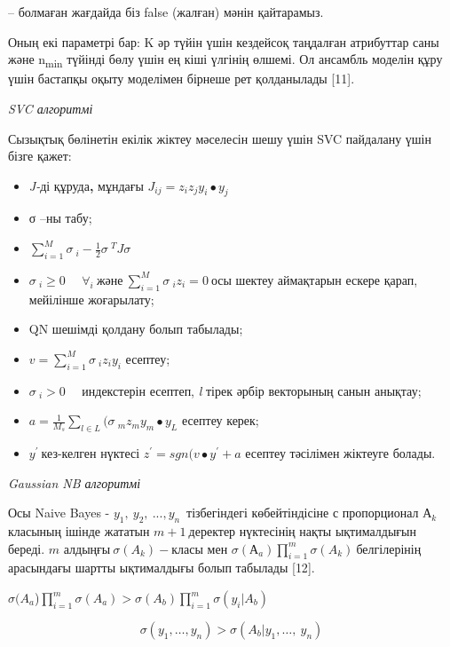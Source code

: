 \documentclass[
]{article}
\begin{document}
-- болмаған жағдайда біз false (жалған) мәнін қайтарамыз.

Оның екі параметрі бар: K әр түйін үшін кездейсоқ таңдалған атрибуттар
саны және n\textsubscript{min} түйінді бөлу үшін ең кіші үлгінің өлшемі.
Ол ансамбль моделін құру үшін бастапқы оқыту моделімен бірнеше рет
қолданылады {[}11{]}.

\emph{SVC алгоритмі}

Сызықтық бөлінетін екілік жіктеу мәселесін шешу үшін SVC пайдалану үшін
бізге қажет:

\begin{itemize}
\item
  \emph{J-}ді құруда\textbf{,} мұндағы
  \(J_{ij} = z_{i}z_{j}y_{i} \bullet y_{j}\)
\item
  σ --ны табу;
\item
  \(\sum_{i = 1}^{M}{}{\sigma\ }_{i} - \frac{1}{2}{\sigma\ }^{T}J\sigma\ \)
\item
  \({\sigma\ }_{i} \geq 0\ \ \ \ \ \ \forall_{i}\ және\ \sum_{i = 1}^{M}{}{\sigma\ }_{i}z_{i} = 0\ \)осы
  шектеу аймақтарын ескере қарап, мейілінше жоғарылату;
\item
  QN шешімді қолдану болып табылады;
\item
  \(v = \sum_{i = 1}^{M}{}{\sigma\ }_{i}z_{i}y_{i}\) есептеу;
\item
  \({\sigma\ }_{i} > 0\ \ \ \ \ \ \)индекстерін есептеп, \emph{l} тірек
  әрбір векторының санын анықтау;
\item
  \(a = \frac{1}{M_{s}}\sum_{l \in L}^{}{}({\sigma\ }_{m}z_{m}y_{m} \bullet y_{L}\)
  есептеу керек;
\item
  \(y^{'}\ \)кез-келген нүктесі \(z^{'} = sgn(v \bullet y^{'} + a\)
  есептеу тәсілімен жіктеуге болады.
\end{itemize}

\emph{Gaussian NB алгоритмі}

Осы Naive Bayes - \(y_{1},\ y_{2},\ ...,y_{n\ }\) тізбегіндегі
көбейтіндісіне с пропорционал \(А_{k}\)класының ішінде жататын
\(m + 1\ \)деректер нүктесінің нақты ықтималдығын береді. \(m\)
алдыңғы\(\ \sigma\left( A_{k} \right) -\)класы мен
\(\sigma\left( А_{a} \right)\prod_{i = 1}^{m}{}\sigma\left( A_{k} \right)\ \)белгілерінің
арасындағы шартты ықтималдығы болып табылады {[}12{]}.

\(\sigma(A_{a}\))\(\prod_{i = 1}^{m}{}\sigma\left( A_{a} \right) > \sigma(A_{b})\prod_{i = 1}^{m}{}\sigma(y_{i}|A_{b})\)

\[\sigma\left( y_{1},\ldots,y_{n} \right) > \sigma(A_{b}|y_{1},\ldots,\ y_{n})\]
\end{document}
